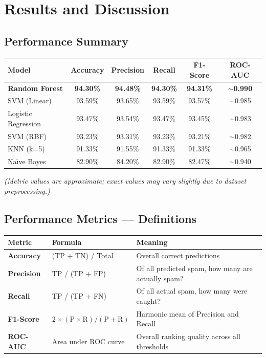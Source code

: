 \documentclass[12pt, a4paper]{article}
\begin{document}
\section{Results and Discussion}

\subsection{Performance Summary}

\begin{table}[h]
\centering
\begin{tabular}{|l|c|c|c|c|c|}
\hline
\textbf{Model} & \textbf{Accuracy} & \textbf{Precision} & \textbf{Recall} & \textbf{F1-Score} & \textbf{ROC-AUC} \\ \hline
\textbf{Random Forest} & \textbf{94.30\%} & \textbf{94.48\%} & \textbf{94.30\%} & \textbf{94.31\%} & \textbf{$\sim$0.990} \\ \hline
SVM (Linear) & 93.59\% & 93.65\% & 93.59\% & 93.57\% & $\sim$0.985 \\ \hline
Logistic Regression & 93.47\% & 93.54\% & 93.47\% & 93.45\% & $\sim$0.983 \\ \hline
SVM (RBF) & 93.23\% & 93.31\% & 93.23\% & 93.21\% & $\sim$0.982 \\ \hline
KNN (k=5) & 91.33\% & 91.55\% & 91.33\% & 91.33\% & $\sim$0.965 \\ \hline
Na\"{\i}ve Bayes & 82.90\% & 84.20\% & 82.90\% & 82.47\% & $\sim$0.940 \\ \hline
\end{tabular}
\end{table}
\textit{(Metric values are approximate; exact values may vary slightly due to dataset preprocessing.)}

\subsection{Performance Metrics --- Definitions}

\begin{table}[h]
\centering
\begin{tabular}{|l|l|p{6cm}|}
\hline
\textbf{Metric} & \textbf{Formula} & \textbf{Meaning} \\ \hline
\textbf{Accuracy} & (TP + TN) / Total & Overall correct predictions \\ \hline
\textbf{Precision} & TP / (TP + FP) & Of all predicted spam, how many are actually spam? \\ \hline
\textbf{Recall} & TP / (TP + FN) & Of all actual spam, how many were caught? \\ \hline
\textbf{F1-Score} & $2 \times (\text{P} \times \text{R}) / (\text{P} + \text{R})$ & Harmonic mean of Precision and Recall \\ \hline
\textbf{ROC-AUC} & Area under ROC curve & Overall ranking quality across all thresholds \\ \hline
\end{tabular}
\end{table}
\end{document}
